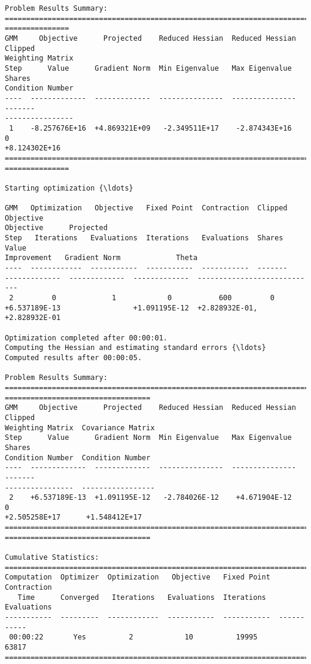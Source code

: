 \begin{Verbatim}[commandchars=\\\{\}]
Problem Results Summary:
================================================================================
===============
GMM     Objective      Projected    Reduced Hessian  Reduced Hessian  Clipped
Weighting Matrix
Step      Value      Gradient Norm  Min Eigenvalue   Max Eigenvalue   Shares
Condition Number
----  -------------  -------------  ---------------  ---------------  -------
----------------
 1    -8.257676E+16  +4.869321E+09   -2.349511E+17    -2.874343E+16      0
+8.124302E+16
================================================================================
===============

Starting optimization {\ldots}

GMM   Optimization   Objective   Fixed Point  Contraction  Clipped    Objective
Objective      Projected
Step   Iterations   Evaluations  Iterations   Evaluations  Shares       Value
Improvement   Gradient Norm             Theta
----  ------------  -----------  -----------  -----------  -------
-------------  -------------  -------------  ----------------------------
 2         0             1            0           600         0
+6.537189E-13                 +1.091195E-12  +2.828932E-01, +2.828932E-01

Optimization completed after 00:00:01.
Computing the Hessian and estimating standard errors {\ldots}
Computed results after 00:00:05.

Problem Results Summary:
================================================================================
==================================
GMM     Objective      Projected    Reduced Hessian  Reduced Hessian  Clipped
Weighting Matrix  Covariance Matrix
Step      Value      Gradient Norm  Min Eigenvalue   Max Eigenvalue   Shares
Condition Number  Condition Number
----  -------------  -------------  ---------------  ---------------  -------
----------------  -----------------
 2    +6.537189E-13  +1.091195E-12   -2.784026E-12    +4.671904E-12      0
+2.505258E+17      +1.548412E+17
================================================================================
==================================

Cumulative Statistics:
===========================================================================
Computation  Optimizer  Optimization   Objective   Fixed Point  Contraction
   Time      Converged   Iterations   Evaluations  Iterations   Evaluations
-----------  ---------  ------------  -----------  -----------  -----------
 00:00:22       Yes          2            10          19995        63817
===========================================================================


\end{Verbatim}
